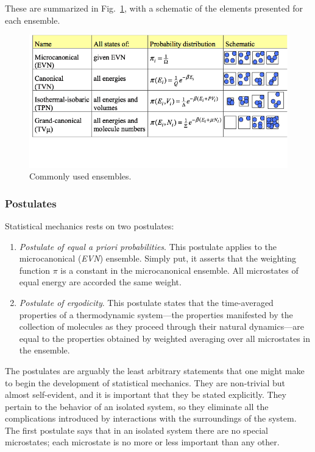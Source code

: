 \documentclass[]{article}
\begin{document}
These are summarized in Fig.~\ref{fig:ensembles}, with a schematic of the elements
presented for each ensemble.

\begin{figure}
\includegraphics[width=\textwidth]{StatMech_figures/image003}
\caption{\label{fig:ensembles}Commonly used ensembles.}
\end{figure}


\subsubsection{Postulates}\label{postulates}

Statistical mechanics rests on two postulates:

\begin{enumerate}
\def\labelenumi{\arabic{enumi}.}
\item
  \emph{Postulate of equal \emph{a priori} probabilities}. This
  postulate applies to the microcanonical (\emph{EVN}) ensemble. Simply put, it
  asserts that the weighting function $\pi$ is a constant in the
  microcanonical ensemble. All microstates of equal energy are accorded
  the same weight.
\item
  \emph{Postulate of ergodicity}. This postulate states that the
  time-averaged properties of a thermodynamic system---the properties
  manifested by the collection of molecules as they proceed through
  their natural dynamics---are equal to the properties obtained by
  weighted averaging over all microstates in the ensemble.
\end{enumerate}

The postulates are arguably the least arbitrary statements that one
might make to begin the development of statistical mechanics. They are
non-trivial but almost self-evident, and it is important that they be
stated explicitly. They pertain to the behavior of an isolated system,
so they eliminate all the complications introduced by interactions with
the surroundings of the system. The first postulate says that in an
isolated system there are no special microstates; each microstate is no
more or less important than any other.
\end{document}

